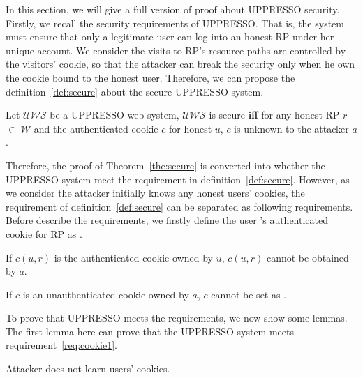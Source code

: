 \begin{appendices}
In this section, we will give a full version of proof about UPPRESSO security. Firstly, we recall the security requirements of UPPRESSO. That is, the system must ensure that only a legitimate user can log into an honest RP under her unique account. We consider the visits to RP's resource paths are controlled by the visitors' cookie, so that the attacker can break the security only when he own the cookie bound to the honest user. Therefore, we can propose the definition~\ref{def:secure} about the secure UPPRESSO system.
\begin{redef}
Let $\mathcal{UWS}$ be a UPPRESSO web system, $\mathcal{UWS}$ is secure \textbf{iff} for any honest RP $r$ $\in $ $\mathcal{W}$ and  the authenticated cookie $c$ for honest $u$,  $c$ is unknown to the attacker $a$. 
\end{redef}
Therefore, the proof of Theorem~\ref{the:secure} is converted into whether the UPPRESSO system meet the requirement in definition~\ref{def:secure}. However, as we consider the attacker initially knows any honest users' cookies, the requirement of definition~\ref{def:secure} can be separated as following requirements. Before describe the requirements, we firstly define the user 's authenticated cookie for RP  as .
\begin{req}
If $c(u,r)$ is the authenticated cookie owned by $u$, $c(u,r)$ cannot be obtained by $a$.
\label{req:cookie1}
\end{req}
\begin{req}
If $c$ is an unauthenticated cookie owned by $a$, $c$ cannot be set as . 
\label{req:cookie2}
\end{req}

To prove that UPPRESSO meets the requirements, we now show some lemmas. The first lemma here can prove that the UPPRESSO system meets requirement~\ref{req:cookie1}.
\begin{relemma}
Attacker does not learn users' cookies.
\label{rel:cookie}
\end{relemma}


\end{appendices}
